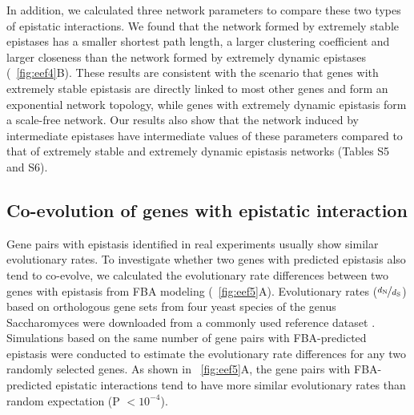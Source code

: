 
In addition, we calculated three network parameters to compare these
two types of epistatic interactions. We found that the network formed
by extremely stable epistases has a smaller shortest path length, a
larger clustering coefficient and larger closeness than the network
formed by extremely dynamic epistases (\Fig~\ref{fig:eef4}B). These results are
consistent with the scenario that genes with extremely stable
epistasis are directly linked to most other genes and form an
exponential network topology, while genes with extremely dynamic
epistasis form a scale-free network. Our results also show that the
network induced by intermediate epistases have intermediate values of
these parameters compared to that of extremely stable and extremely
dynamic epistasis networks (Tables S5 and S6).

\subsection{Co-evolution of genes with epistatic interaction}

Gene pairs with epistasis identified in real experiments usually show
similar evolutionary rates. To investigate whether two genes with
predicted epistasis also tend to co-evolve, we calculated the
evolutionary rate differences between two genes with epistasis from
FBA modeling (\Fig~\ref{fig:eef5}A). Evolutionary rates
($\nicefrac{d_\textnormal{N}}{d_\textnormal{S}}$) based on orthologous
gene sets
from four yeast species of the genus Saccharomyces were downloaded
from a commonly used reference dataset \citep{Wall2005}. Simulations
based on the same number of gene pairs with FBA-predicted epistasis
were conducted to estimate the evolutionary rate differences for any
two randomly selected genes. As shown in \Fig~\ref{fig:eef5}A, the gene pairs
with FBA-predicted epistatic interactions tend to have more similar
evolutionary rates than random expectation (P $< 10^{-4}$).


